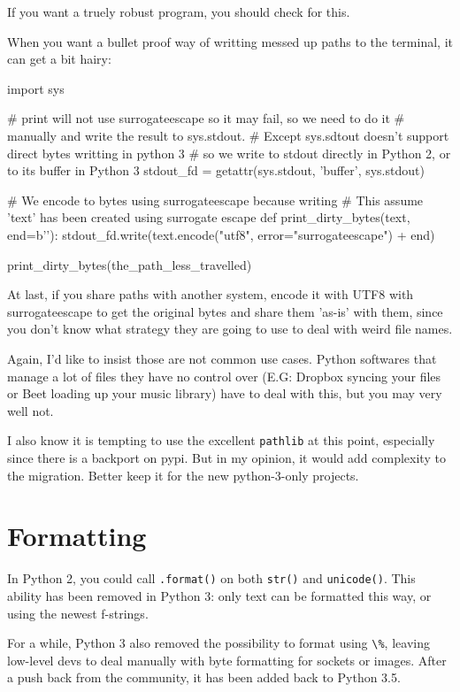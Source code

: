 \begin{py2}
\begin{py2}
\begin{py2}
\begin{py2}
If you want a truely robust program, you should check for this.

When you want a bullet proof way of writting messed up paths to the terminal, it can get a bit hairy:

\begin{py2and3}
import sys

# print will not use surrogateescape so it may fail, so we need to do it
# manually and write the result to sys.stdout.
# Except sys.sdtout doesn't support direct bytes writting in python 3
# so we write to stdout directly in Python 2, or to its buffer in Python 3
stdout_fd = getattr(sys.stdout, 'buffer', sys.stdout)

# We encode to bytes using surrogateescape because writing
# This assume 'text' has been created using surrogate escape
def print_dirty_bytes(text, end=b'\n'):
     stdout_fd.write(text.encode("utf8", error="surrogateescape") + end)

print_dirty_bytes(the_path_less_travelled)
\end{py2and3}

At last, if you share paths with another system, encode it with UTF8 with surrogateescape to get the original bytes and share them 'as-is' with them, since you don't know what strategy they are going to use to deal with weird file names.

Again, I'd like to insist those are not common use cases. Python softwares that manage a lot of files they have no control over (E.G: Dropbox syncing your files or Beet loading up your music library) have to deal with this, but you may very well not.

I also know it is tempting to use the excellent \lstinline{pathlib} at this point, especially since there is a backport on pypi. But in my opinion, it would add complexity to the migration. Better keep it for the new python-3-only projects.

\section{Formatting}

In Python 2, you could call \lstinline{.format()} on both \lstinline{str()} and \lstinline{unicode()}. This ability has been removed in Python 3: only text can be formatted this way, or using the newest f-strings.

For a while, Python 3 also removed the possibility to format using \lstinline{\%}, leaving low-level devs to deal manually with byte formatting for sockets or images. After a push back from the community, it has been added back to Python 3.5.


\end{py2}
\end{py2}
\end{py2}
\end{py2}
